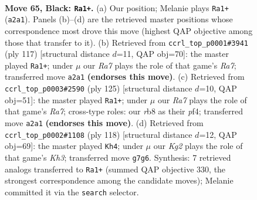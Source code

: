 \documentclass[11pt]{article}
\begin{document}
\clearpage

\begin{figure}[p]\centering
\begin{subfigure}{0.46\textwidth}\centering
\resizebox{\linewidth}{!}{%
\newchessgame
\chessboard[
  setfen={1R6/R4pk1/4p3/8/P3P3/5P2/r7/5K2 b - - 22 65},
  showmover=false,
  pgfstyle=straightmove, color=movearrow, markmove={a2-a1}
]}
\caption{}
\end{subfigure}\hfill
\begin{subfigure}{0.46\textwidth}\centering
\resizebox{\linewidth}{!}{%
\newchessgame
\chessboard[
  setfen={8/8/R4pk1/6p1/P5P1/7P/r7/6K1 b - - 8 59},
  showmover=false,
  pgfstyle=straightmove, color=movearrow, markmove={a2-a1}
]}
\caption{}
\end{subfigure}
\\[4pt]
\begin{subfigure}{0.46\textwidth}\centering
\resizebox{\linewidth}{!}{%
\newchessgame
\chessboard[
  setfen={8/R5p1/8/1P6/P2k1P2/3p4/r7/4K3 b - - 0 63},
  showmover=false,
  pgfstyle=straightmove, color=movearrow, markmove={a2-a1}
]}
\caption{}
\end{subfigure}\hfill
\begin{subfigure}{0.46\textwidth}\centering
\resizebox{\linewidth}{!}{%
\newchessgame
\chessboard[
  setfen={1R6/6k1/1p4p1/8/5P2/1r4PK/8/8 w - - 29 60},
  showmover=false,
  pgfstyle=straightmove, color=movearrow, markmove={h3-h4}
]}
\caption{}
\end{subfigure}
\caption{\textbf{Move 65, Black: \texttt{Ra1+}.} (a) Our position; Melanie plays \texttt{Ra1+} (\texttt{a2a1}). Panels (b)--(d) are the retrieved master positions whose correspondence most drove this move (highest QAP objective among those that transfer to it). (b) Retrieved from \texttt{ccrl\_top\_p0001\#3941} (ply 117) [structural distance $d$=11, QAP obj=70]: the master played \texttt{Ra1+}; under $\mu$ our \emph{Ra7} plays the role of that game's \emph{Ra7}; transferred move \texttt{a2a1} \textbf{(endorses this move)}. (c) Retrieved from \texttt{ccrl\_top\_p0003\#2590} (ply 125) [structural distance $d$=10, QAP obj=51]: the master played \texttt{Ra1+}; under $\mu$ our \emph{Ra7} plays the role of that game's \emph{Ra7}; cross-type roles: our \emph{r}b8 as their \emph{p}f4; transferred move \texttt{a2a1} \textbf{(endorses this move)}. (d) Retrieved from \texttt{ccrl\_top\_p0002\#1108} (ply 118) [structural distance $d$=12, QAP obj=69]: the master played \texttt{Kh4}; under $\mu$ our \emph{Kg2} plays the role of that game's \emph{Kh3}; transferred move \texttt{g7g6}. Synthesis: 7 retrieved analogs transferred to \texttt{Ra1+} (summed QAP objective 330, the strongest correspondence among the candidate moves); Melanie committed it via the \texttt{search} selector.}
\label{fig:thought-m129}
\end{figure}
\end{document}

